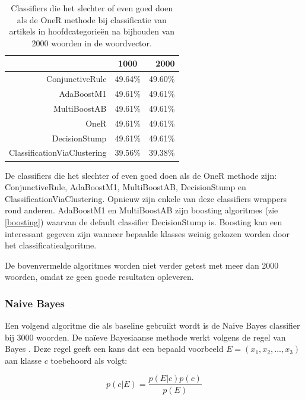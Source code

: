 \begin{table}[htbp]
	\centering
	\caption{Classifiers die het slechter of even goed doen als de OneR methode bij classificatie van artikels in hoofdcategorie\"en na bijhouden van 2000 woorden in de woordvector.}
	\begin{tabular}{rrr}
		\toprule
		& \multicolumn{1}{c}{1000} & 2000 \\
		\midrule
		ConjunctiveRule & \multicolumn{1}{c}{49.64\%} & \multicolumn{1}{c}{49.60\%} \\
		AdaBoostM1 & \multicolumn{1}{c}{49.61\%} & \multicolumn{1}{c}{49.61\%} \\
		MultiBoostAB & \multicolumn{1}{c}{49.61\%} & \multicolumn{1}{c}{49.61\%} \\
		OneR  & \multicolumn{1}{c}{49.61\%} & \multicolumn{1}{c}{49.61\%} \\
		DecisionStump & \multicolumn{1}{c}{49.61\%} & \multicolumn{1}{c}{49.61\%} \\
		ClassificationViaClustering & \multicolumn{1}{c}{39.56\%} & \multicolumn{1}{c}{39.38\%} \\
		\bottomrule
	\end{tabular}%
	
	\label{tab:addlabel}%
\end{table}%
 

De classifiers die het slechter of even goed doen als de OneR methode zijn: ConjunctiveRule, AdaBoostM1, MultiBoostAB, DecisionStump en ClassificationViaClustering. Opnieuw zijn enkele van deze classifiers wrappers rond anderen. AdaBoostM1 en MultiBoostAB zijn boosting algoritmes (zie \ref{boosting}) waarvan de default classifier DecisionStump is. Boosting kan een interessant gegeven zijn wanneer bepaalde klasses weinig gekozen worden door het classificatiealgoritme.

De bovenvermelde algoritmes worden niet verder getest met meer dan 2000 woorden, omdat ze geen goede resultaten opleveren.  	

\subsubsection{Naive Bayes}
Een volgend algoritme die als baseline gebruikt wordt is de Naive Bayes classifier bij 3000 woorden. De na\"ieve Bayesiaanse methode werkt volgens de regel van Bayes \cite{Zhang2004}. Deze regel geeft een kans dat een bepaald voorbeeld $E = (x_1, x_2, ..., x_3)$ aan klasse $c$ toebehoord als volgt:

\begin{equation}
p(c|E) = \frac{p(E|c)p(c)}{p(E)}
\end{equation}

